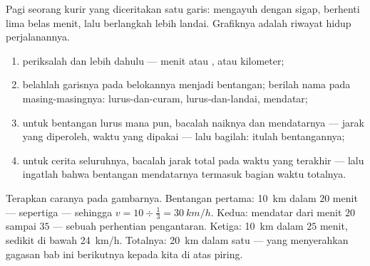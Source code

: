 \begin{omfigure}

{\small Pagi seorang kurir yang diceritakan satu garis: mengayuh
dengan sigap, berhenti lima belas menit, lalu berlangkah lebih landai.
Grafiknya adalah riwayat hidup perjalanannya.}
\end{omfigure}

\begin{method}\label{met:g7:motion-average-speed:read}
\begin{enumerate}
  \item periksalah  dan  lebih dahulu --- menit atau
        ,  atau kilometer;
  \item belahlah garisnya pada belokannya menjadi bentangan; berilah
        nama pada masing-masingnya: lurus-dan-curam,
        lurus-dan-landai, mendatar;
  \item untuk bentangan lurus mana pun, bacalah naiknya dan
        mendatarnya --- jarak yang diperoleh, waktu yang dipakai ---
        lalu bagilah: itulah  bentangannya;
  \item untuk cerita seluruhnya, bacalah jarak total pada waktu yang
        terakhir --- lalu ingatlah bahwa bentangan mendatarnya
        termasuk bagian waktu totalnya.
\end{enumerate}
\end{method}

\begin{example}\label{ex:g7:motion-average-speed:decoded}
Terapkan caranya pada gambarnya. Bentangan pertama: \qty{10}{km} dalam
$20$ menit --- sepertiga  --- sehingga $v = 10 \div
\tfrac{1}{3} = \qty{30}{km/h}$. Kedua: mendatar dari menit $20$ sampai
$35$ --- sebuah perhentian pengantaran. Ketiga: \qty{10}{km} dalam $25$
menit, sedikit di bawah \qty{24}{km/h}. Totalnya: \qty{20}{km} dalam
satu  --- yang menyerahkan gagasan bab ini berikutnya kepada kita
di atas piring.
\end{example}


